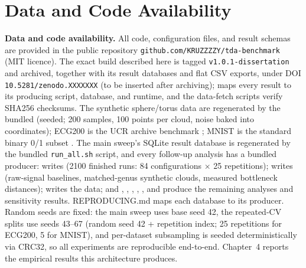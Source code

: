 \documentclass[12pt, a4paper]{report}
\theoremstyle{definition}
\theoremstyle{plain}
\theoremstyle{remark}
\begin{document}
\section{Data and Code Availability}

\textbf{Data and code availability.} All code, configuration files,
and result schemas are provided in the public repository
\texttt{github.com/KRUZZZZY/tda\allowbreak-benchmark} (MIT licence). The
exact build described here is tagged \texttt{v1.0.1-dissertation} and archived,
together with its result databases and flat CSV exports, under DOI
\texttt{10.5281/zenodo.XXXXXXX} (to be inserted after archiving);
 maps every result to its producing script, database,
and runtime, and the data-fetch scripts verify SHA256 checksums. The
synthetic sphere/torus data are regenerated by the bundled
 (seeded; 200 samples,
100 points per cloud, noise baked into coordinates); ECG200 is the
UCR archive benchmark \cite{dau2019}; MNIST is the standard
binary 0/1 subset \cite{lecun1998}. The main sweep's SQLite result
database is regenerated by the bundled \texttt{run\_all.sh} script, and
every follow-up analysis has a bundled producer:
 writes
 (2100 finished runs: 84
configurations $\times$ 25 repetitions);
 writes
 (raw-signal baselines,
matched-genus synthetic clouds, measured bottleneck distances);
 writes the
 data; and
,
,
,
,
, and
 produce the remaining analyses
and sensitivity results. REPRODUCING.md maps each database to its
producer. Random seeds are fixed: the main
sweep uses base seed 42, the repeated-CV splits use seeds 43--67
(random seed 42 + repetition index; 25 repetitions for ECG200, 5
for MNIST), and per-dataset subsampling is seeded deterministically
via CRC32, so all experiments are
reproducible end-to-end. Chapter~4 reports the empirical results this
architecture produces.

\newpage

\end{document}
